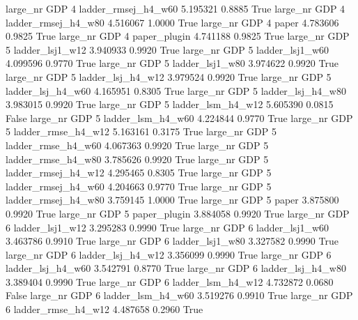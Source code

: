   large_nr      GDP                 4 ladder_rmsej_h4_w60    5.195321      0.8885    True
  large_nr      GDP                 4 ladder_rmsej_h4_w80    4.516067      1.0000    True
  large_nr      GDP                 4               paper    4.783606      0.9825    True
  large_nr      GDP                 4        paper_plugin    4.741188      0.9825    True
  large_nr      GDP                 5     ladder_lsj1_w12    3.940933      0.9920    True
  large_nr      GDP                 5     ladder_lsj1_w60    4.099596      0.9770    True
  large_nr      GDP                 5     ladder_lsj1_w80    3.974622      0.9920    True
  large_nr      GDP                 5   ladder_lsj_h4_w12    3.979524      0.9920    True
  large_nr      GDP                 5   ladder_lsj_h4_w60    4.165951      0.8305    True
  large_nr      GDP                 5   ladder_lsj_h4_w80    3.983015      0.9920    True
  large_nr      GDP                 5   ladder_lsm_h4_w12    5.605390      0.0815   False
  large_nr      GDP                 5   ladder_lsm_h4_w60    4.224844      0.9770    True
  large_nr      GDP                 5  ladder_rmse_h4_w12    5.163161      0.3175    True
  large_nr      GDP                 5  ladder_rmse_h4_w60    4.067363      0.9920    True
  large_nr      GDP                 5  ladder_rmse_h4_w80    3.785626      0.9920    True
  large_nr      GDP                 5 ladder_rmsej_h4_w12    4.295465      0.8305    True
  large_nr      GDP                 5 ladder_rmsej_h4_w60    4.204663      0.9770    True
  large_nr      GDP                 5 ladder_rmsej_h4_w80    3.759145      1.0000    True
  large_nr      GDP                 5               paper    3.875800      0.9920    True
  large_nr      GDP                 5        paper_plugin    3.884058      0.9920    True
  large_nr      GDP                 6     ladder_lsj1_w12    3.295283      0.9990    True
  large_nr      GDP                 6     ladder_lsj1_w60    3.463786      0.9910    True
  large_nr      GDP                 6     ladder_lsj1_w80    3.327582      0.9990    True
  large_nr      GDP                 6   ladder_lsj_h4_w12    3.356099      0.9990    True
  large_nr      GDP                 6   ladder_lsj_h4_w60    3.542791      0.8770    True
  large_nr      GDP                 6   ladder_lsj_h4_w80    3.389404      0.9990    True
  large_nr      GDP                 6   ladder_lsm_h4_w12    4.732872      0.0680   False
  large_nr      GDP                 6   ladder_lsm_h4_w60    3.519276      0.9910    True
  large_nr      GDP                 6  ladder_rmse_h4_w12    4.487658      0.2960    True
